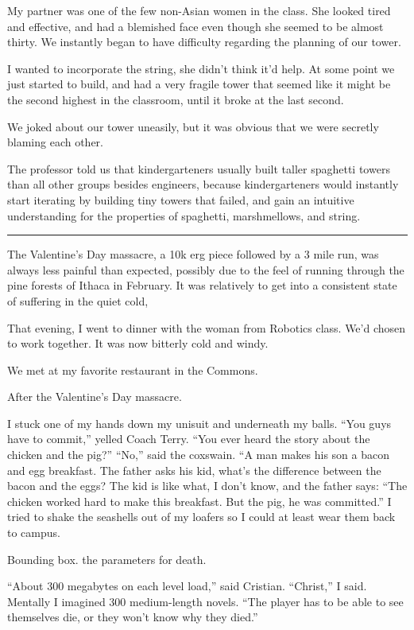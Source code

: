 My partner was one of the few non-Asian women in the class.  She looked tired
and effective, and had a blemished face even though she seemed to be almost
thirty.  We instantly began to have difficulty regarding the planning of our
tower.  

I wanted to incorporate the string, she didn't think it'd help.  At some point
we just started to build, and had a very fragile tower that seemed like it might
be the second highest in the classroom, until it broke at the last second.

We joked about our tower uneasily, but it was obvious that we were secretly
blaming each other.

The professor told us that kindergarteners usually built taller spaghetti towers
than all other groups besides engineers, because kindergarteners would
instantly start iterating by building tiny towers that failed, and gain an
intuitive understanding for the properties of spaghetti, marshmellows, and
string. 

\plainfancybreak{12pt}{2}{* * *}

The Valentine's Day massacre, a 10k erg piece followed by a 3 mile run, was
always less painful than expected, possibly due to the feel of running through
the pine forests of Ithaca in February.  It was relatively to get into a
consistent state of suffering in the quiet cold, 

That evening, I went to dinner with the woman from Robotics class.  We'd chosen
to work together.  It was now bitterly cold and windy.

We met at my favorite restaurant in the Commons.



After the Valentine's Day massacre.

I stuck one of my hands down my unisuit and underneath my balls.  ``You guys
have to commit,'' yelled Coach Terry.  ``You ever heard the story about the
chicken and the pig?'' ``No,'' said the coxswain.  ``A man makes his son a bacon
and egg breakfast.  The father asks his kid, what's the difference between the
bacon and the eggs?  The kid is like what, I don't know, and the father says:
``The chicken worked hard to make this breakfast.  But the pig, he was
committed.'' I tried to shake the seashells out of my loafers so I could at
least wear them back to campus. 

Bounding box.  the parameters for death.

``About 300 megabytes on each level load,'' said Cristian.  ``Christ,'' I said.
Mentally I imagined 300 medium-length novels.  ``The player has to be able to
see themselves die, or they won't know why they died.'' 

